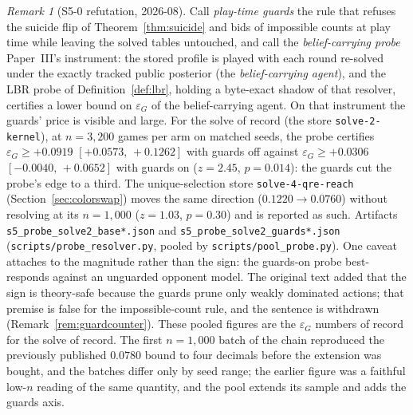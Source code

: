 \documentclass[11pt]{article}
\theoremstyle{plain}
\theoremstyle{definition}
\theoremstyle{remark}
\newtheorem{remark}[theorem]{Remark}
\newcommand{\code}[1]{\texttt{\small #1}}
\newcommand{\game}{\ensuremath{G}}
\newcommand{\epsG}{\ensuremath{\varepsilon_{\game}}}
\begin{document}
\begin{remark}[S5-0 refutation, 2026-08]\label{rem:s5refutation}
Call \emph{play-time guards} the rule that refuses the suicide flip of
Theorem~\ref{thm:suicide} and bids of impossible counts at play time
while leaving the solved tables untouched, and call the
\emph{belief-carrying probe} Paper~III's instrument: the stored profile
is played with each round re-solved under the exactly tracked public
posterior (the \emph{belief-carrying agent}), and the LBR probe of
Definition~\ref{def:lbr}, holding a byte-exact shadow of that
resolver, certifies a lower bound on $\epsG$ of the belief-carrying
agent.
On that instrument the guards' price is visible and large. For the
solve of record (the store \code{solve-2-kernel}), at $n=3{,}200$
games per arm on matched seeds, the probe certifies
$\epsG \ge +0.0919$ $[+0.0573,\,+0.1262]$ with guards off against
$\epsG \ge +0.0306$ $[-0.0040,\,+0.0652]$ with guards on ($z=2.45$,
$p=0.014$): the guards cut the probe's edge to a third. The
unique-selection store \code{solve-4-qre-reach}
(Section~\ref{sec:colorswap}) moves the same direction
($0.1220 \to 0.0760$) without resolving at its $n=1{,}000$
($z=1.03$, $p=0.30$) and is reported as such. Artifacts
\code{s5\_probe\_solve2\_base*.json} and
\code{s5\_probe\_solve2\_guards*.json}
(\code{scripts/probe\_resolver.py}, pooled by
\code{scripts/pool\_probe.py}). One caveat attaches to the magnitude
rather than the sign: the guards-on probe best-responds against an
unguarded opponent model. The original text added that the sign is
theory-safe because the guards prune only weakly dominated actions;
that premise is false for the impossible-count rule, and the sentence
is withdrawn (Remark~\ref{rem:guardcounter}). These pooled figures are
the $\epsG$ numbers of record for the solve of record. The first
$n=1{,}000$ batch of the chain reproduced the previously published
$0.0780$ bound to four decimals before the extension was bought, and
the batches differ only by seed range; the earlier figure was a
faithful low-$n$ reading of the same quantity, and the pool extends
its sample and adds the guards axis.
\end{remark}
\end{document}
